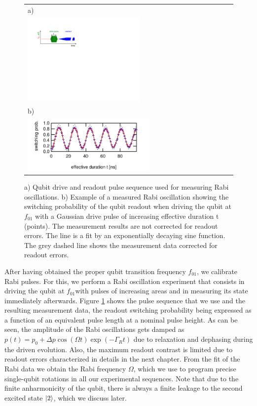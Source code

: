 \begin{figure}
\begin{tabular}{l}
a) \\ \includegraphics[width=0.55\textwidth]{"./material/figures/measurement/qubit_rabi_oscillation"} \\
b) \\ \includegraphics[width=0.6\textwidth]{"./data/ct5/2011_04_21 - grover and tomo/example - qubit 2 rabi"} \\
\end{tabular}
\caption[]{a) Qubit drive and readout pulse sequence used for measuring Rabi oscillations. b) Example of a measured Rabi oscillation showing the switching probability of the qubit readout when driving the qubit at $f_{01}$ with a Gaussian drive pulse of increasing effective duration t (points). The measurement results are not corrected for readout errors. The line is a fit by an exponentially decaying sine function. The grey dashed line shows the measurement data corrected for readout errors.}
\label{fig:qubit_rabi_example}
\end{figure}

After having obtained the proper qubit transition frequency $f_{01}$, we calibrate Rabi pulses. For this, we  perform a Rabi oscillation experiment that consists in driving the qubit at $f_{01} $with pulses of increasing areas and in measuring its state immediately afterwards. Figure \ref{fig:qubit_rabi_example} shows the pulse sequence that we use and the resulting measurement data, the readout switching probability being expressed as a function of an equivalent pulse length at a nominal pulse height. As can be seen, the amplitude of the Rabi oscillations gets damped as  $p(t)=p_0+{\Delta}p\cos{(\Omega t)}\exp{(-\Gamma_R t)}$ due to relaxation and dephasing during the driven evolution. Also, the maximum readout contrast is limited due to readout errors characterized in details in the next chapter. From the fit of the Rabi data we obtain the Rabi frequency $\Omega$, which we use to program precise single-qubit rotations in all our experimental sequences. Note that due to the finite anharmonicity of the qubit, there is always a finite leakage to the second excited state $\left| 2 \right>$, which we discuss later.

